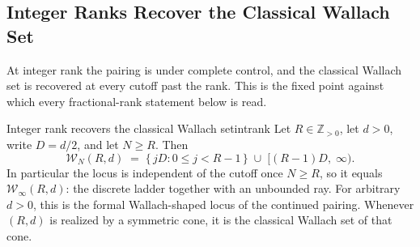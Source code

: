 \documentclass[11pt,letterpaper]{article}
\newcommand{\Zint}{\mathbb{Z}}
\begin{document}
\subsection{Integer Ranks Recover the Classical Wallach Set}
At integer rank the pairing is under complete control, and the classical Wallach
set is recovered at every cutoff past the rank. This is the fixed point against
which every fractional-rank statement below is read.

\begin{theorem}{Integer rank recovers the classical Wallach set}{intrank}
Let $R\in\Zint_{>0}$, let $d>0$, write $D=d/2$, and let $N\ge R$. Then
\begin{equation}
  \mathcal{W}_N(R,d)
  \;=\;\bigl\{\,jD:0\le j<R-1\,\bigr\}\;\cup\;\bigl[(R-1)D,\;\infty\bigr).
  \label{eq:intrank}
\end{equation}
In particular the locus is independent of the cutoff once $N\ge R$, so it equals
$\mathcal{W}_\infty(R,d)$: the discrete ladder together with an unbounded ray.
For arbitrary $d>0$, this is the formal Wallach-shaped locus of the continued
pairing. Whenever $(R,d)$ is realized by a symmetric cone, it is the classical
Wallach set of that cone.
\end{theorem}
\end{document}
